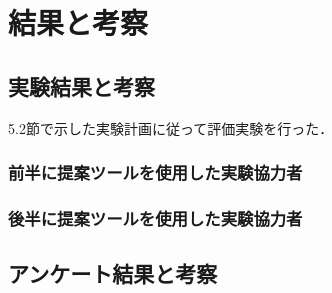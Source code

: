 \chapter{結果と考察}

\section{実験結果と考察}
5.2節で示した実験計画に従って評価実験を行った．

\subsection{前半に提案ツールを使用した実験協力者}

\subsection{後半に提案ツールを使用した実験協力者}

\section{アンケート結果と考察}